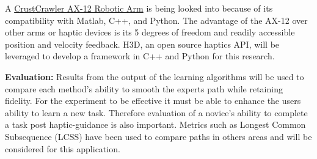 \documentclass[11pt, final]{article}
\begin{document}
A \href{http://www.crustcrawler.com/products/smartarm/index.php?prod=12}{CrustCrawler AX-12 Robotic Arm} is being looked into because of its compatibility with Matlab, C++, and Python. The advantage of the AX-12 over other arms or haptic devices is its 5 degrees of freedom and readily accessible position and velocity feedback. H3D, an open source haptics API, will be leveraged to develop a framework in C++ and Python for this research. 

{\bf \large Evaluation:}
Results from the output of the learning algorithms will be used to compare each method's ability to smooth the experts path while retaining fidelity. For the experiment to be effective it must be able to enhance the users ability to learn a new task. Therefore evaluation of a novice's ability to complete a task post haptic-guidance is also important. Metrics such as Longest Common Subsequence (LCSS) have been used to compare paths in others areas and will be considered for this application.

\newpage



%
%
%
%
%
%
%

\end{document}
